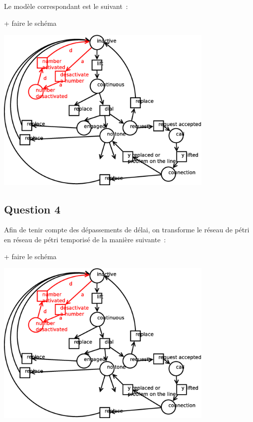 Le modèle correspondant est le suivant~:

+ faire le schéma

\begin{center}
\includegraphics[height = 8cm]{exo9_2.eps}
\end{center}
\subsection{Question 4}

Afin de tenir compte des dépassements de délai, on transforme le
réseau de pétri en réseau de pétri temporisé de la manière suivante~:

+ faire le schéma

\begin{center}
\includegraphics[height = 8cm]{exo9_3.eps}
\end{center}
